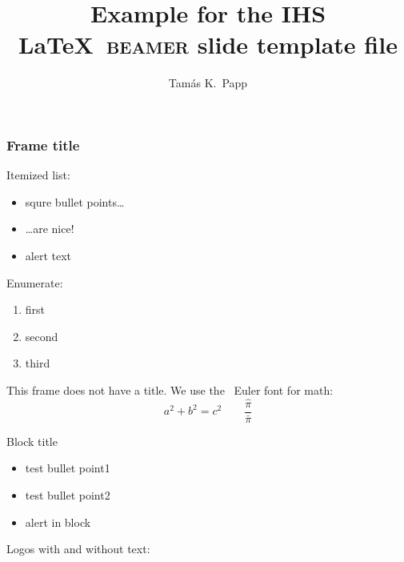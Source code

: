 \documentclass{beamer}
\begin{document}
\title[Short title]{Example for the IHS \LaTeX\ \textsc{beamer} slide template file}
\author[Tam\'as]{Tam\'as K.~Papp}

\begin{frame}[plain]
  \titlepage
\end{frame}

\begin{frame}
  \frametitle{Frame title}

  Itemized list:

  \begin{itemize}
  \item squre bullet points\dots
  \item \dots are nice!
  \item \alert{alert text}
  \end{itemize}

  \bigskip
  
  Enumerate:

  \begin{enumerate}
  \item first
  \item second
  \item third
  \end{enumerate}

\end{frame}

\begin{frame}
  This frame does not have a title.  We use the \AmS\ Euler font for math:
  \begin{equation*}
    a^2+b^2=c^2 \qquad \frac{\hat\pi}{\bar\pi}
  \end{equation*}

  \begin{block}{Block title}
    \begin{itemize}
    \item test bullet point1
    \item test bullet point2
    \item \alert{alert in block}
    \end{itemize}
  \end{block}

  \bigskip

  Logos with and without text:
  \begin{center}
    \IHSlogotext[height=2em] \hspace{2em} \IHSlogo[height=2em]
  \end{center}
\end{frame}
\end{document}
